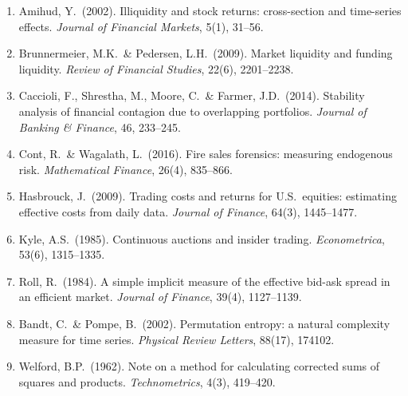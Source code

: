 \documentclass[11pt,a4paper]{article}
\theoremstyle{definition}
\theoremstyle{plain}
\begin{document}
\begin{enumerate}
  \item Amihud, Y.\ (2002). Illiquidity and stock returns: cross-section and time-series effects.
        \textit{Journal of Financial Markets}, 5(1), 31--56.

  \item Brunnermeier, M.K.\ \& Pedersen, L.H.\ (2009). Market liquidity and funding liquidity.
        \textit{Review of Financial Studies}, 22(6), 2201--2238.

  \item Caccioli, F., Shrestha, M., Moore, C.\ \& Farmer, J.D.\ (2014). Stability analysis of
        financial contagion due to overlapping portfolios. \textit{Journal of Banking \& Finance},
        46, 233--245.

  \item Cont, R.\ \& Wagalath, L.\ (2016). Fire sales forensics: measuring endogenous risk.
        \textit{Mathematical Finance}, 26(4), 835--866.

  \item Hasbrouck, J.\ (2009). Trading costs and returns for U.S.\ equities: estimating effective
        costs from daily data. \textit{Journal of Finance}, 64(3), 1445--1477.

  \item Kyle, A.S.\ (1985). Continuous auctions and insider trading. \textit{Econometrica}, 53(6),
        1315--1335.

  \item Roll, R.\ (1984). A simple implicit measure of the effective bid-ask spread in an efficient
        market. \textit{Journal of Finance}, 39(4), 1127--1139.

  \item Bandt, C.\ \& Pompe, B.\ (2002). Permutation entropy: a natural complexity measure for time
        series. \textit{Physical Review Letters}, 88(17), 174102.

  \item Welford, B.P.\ (1962). Note on a method for calculating corrected sums of squares and
        products. \textit{Technometrics}, 4(3), 419--420.
\end{enumerate}
\end{document}
